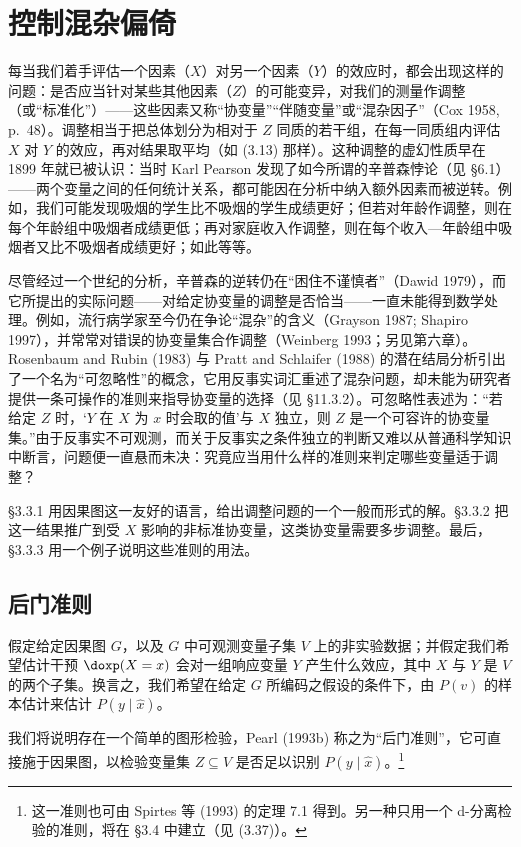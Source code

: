 \section{控制混杂偏倚}

每当我们着手评估一个因素（$X$）对另一个因素（$Y$）的效应时，都会出现这样的问题：是否应当针对某些其他因素（$Z$）的可能变异，对我们的测量作调整（或“标准化”）——这些因素又称“协变量”“伴随变量”或“混杂因子”（Cox 1958, p.~48）。调整相当于把总体划分为相对于 $Z$ 同质的若干组，在每一同质组内评估 $X$ 对 $Y$ 的效应，再对结果取平均（如 \textup{(3.13)} 那样）。这种调整的虚幻性质早在 1899 年就已被认识：当时 Karl Pearson 发现了如今所谓的辛普森悖论（见 \S 6.1）——两个变量之间的任何统计关系，都可能因在分析中纳入额外因素而被逆转。例如，我们可能发现吸烟的学生比不吸烟的学生成绩更好；但若对年龄作调整，则在每个年龄组中吸烟者成绩更低；再对家庭收入作调整，则在每个收入—年龄组中吸烟者又比不吸烟者成绩更好；如此等等。

尽管经过一个世纪的分析，辛普森的逆转仍在“困住不谨慎者”（Dawid 1979），而它所提出的实际问题——对给定协变量的调整是否恰当——一直未能得到数学处理。例如，流行病学家至今仍在争论“混杂”的含义（Grayson 1987; Shapiro 1997），并常常对错误的协变量集合作调整（Weinberg 1993；另见第六章）。Rosenbaum and Rubin (1983) 与 Pratt and Schlaifer (1988) 的潜在结局分析引出了一个名为“可忽略性”的概念，它用反事实词汇重述了混杂问题，却未能为研究者提供一条可操作的准则来指导协变量的选择（见 \S 11.3.2）。可忽略性表述为：“若给定 $Z$ 时，‘$Y$ 在 $X$ 为 $x$ 时会取的值’与 $X$ 独立，则 $Z$ 是一个可容许的协变量集。”由于反事实不可观测，而关于反事实之条件独立的判断又难以从普通科学知识中断言，问题便一直悬而未决：究竟应当用什么样的准则来判定哪些变量适于调整？

\S 3.3.1 用因果图这一友好的语言，给出调整问题的一个一般而形式的解。\S 3.3.2 把这一结果推广到受 $X$ 影响的非标准协变量，这类协变量需要多步调整。最后，\S 3.3.3 用一个例子说明这些准则的用法。

\subsection{后门准则}

假定给定因果图 $G$，以及 $G$ 中可观测变量子集 $V$ 上的非实验数据；并假定我们希望估计干预 $\doxp(X=x)$ 会对一组响应变量 $Y$ 产生什么效应，其中 $X$ 与 $Y$ 是 $V$ 的两个子集。换言之，我们希望在给定 $G$ 所编码之假设的条件下，由 $P(v)$ 的样本估计来估计 $P(y\mid\hat{x})$。

我们将说明存在一个简单的图形检验，Pearl (1993b) 称之为“后门准则”，它可直接施于因果图，以检验变量集 $Z\subseteq V$ 是否足以识别 $P(y\mid\hat{x})$。\footnote{这一准则也可由 Spirtes 等 (1993) 的定理 7.1 得到。另一种只用一个 d-分离检验的准则，将在 \S 3.4 中建立（见 \textup{(3.37)}）。}


